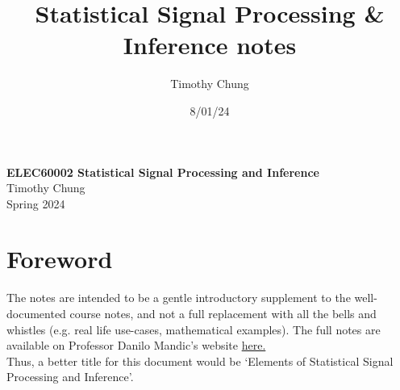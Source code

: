 \documentclass{report}
\title{Statistical Signal Processing \& Inference notes}
\author{Timothy Chung}
\date{8/01/24}
\begin{document}


\begin{titlepage}
    \centering
    \vspace*{1cm}
    \Huge
    \textbf{ELEC60002 Statistical Signal Processing and Inference} \\
    \vspace{1cm}
    \Large
    Timothy Chung \\
    \vspace{1cm}
    Spring 2024 \\
    \vfill
\end{titlepage}

\setcounter{tocdepth}{1}
\tableofcontents
\newpage
\setcounter{chapter}{-1}
\chapter{Foreword}
The notes are intended to be a gentle introductory supplement to the well-documented course notes, and not a full replacement with all the bells and whistles (e.g. real life use-cases, mathematical examples). The full notes are available on Professor Danilo Mandic's website \href{https://www.commsp.ee.ic.ac.uk/~mandic/courses.htm}{here.}\\


Thus, a better title for this document would be `Elements of Statistical Signal Processing and Inference'.




\end{document}
